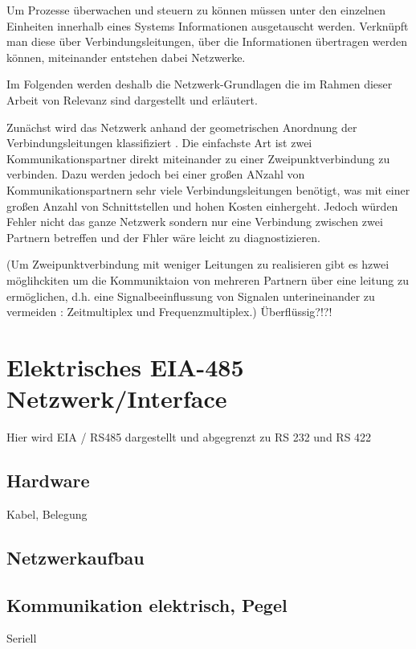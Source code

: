 Um Prozesse überwachen und steuern zu können müssen unter den einzelnen Einheiten innerhalb eines Systems Informationen ausgetauscht werden. Verknüpft man diese über Verbindungsleitungen, über die Informationen übertragen werden können, miteinander entstehen dabei Netzwerke.

Im Folgenden werden deshalb die Netzwerk-Grundlagen die im Rahmen dieser Arbeit von Relevanz sind dargestellt und erläutert.

Zunächst wird das Netzwerk anhand der geometrischen Anordnung der Verbindungsleitungen klassifiziert \cite[S.~1f.]{schn06}. 
Die einfachste Art ist zwei Kommunikationspartner direkt miteinander zu einer Zweipunktverbindung zu verbinden. Dazu werden jedoch bei einer großen ANzahl von Kommunikationspartnern sehr viele Verbindungsleitungen benötigt, was mit einer großen Anzahl von Schnittstellen und hohen Kosten einhergeht. Jedoch würden Fehler nicht das ganze Netzwerk sondern nur eine Verbindung zwischen zwei Partnern betreffen und der Fhler wäre leicht zu diagnostizieren.

(Um Zweipunktverbindung mit weniger Leitungen zu realisieren gibt es hzwei möglihckiten um die Kommuniktaion von mehreren Partnern über eine leitung zu ermöglichen, d.h. eine Signalbeeinflussung von Signalen unterineinander zu vermeiden : Zeitmultiplex und Frequenzmultiplex.) Überflüssig?!?!



\section{Elektrisches EIA-485 Netzwerk/Interface}
Hier wird EIA / RS485 dargestellt und abgegrenzt zu RS 232 und RS 422

\subsection{Hardware}
\label{sub:eia485hardware}
Kabel, Belegung

\subsection{Netzwerkaufbau}
\label{sub:eia485netzwerk}

\subsection{Kommunikation elektrisch, Pegel}
\label{sub:eia485kommunikation}
Seriell



